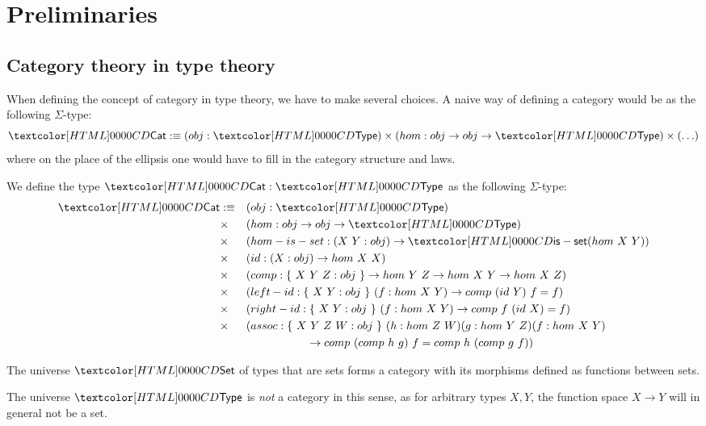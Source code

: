 \chapter{Preliminaries}

\section{Category theory in type theory}

When defining the concept of category in type theory, we have to make
several choices. A naive way of defining a category would be as the
following $\Sigma$-type:
$$
\Cat \ddefeq (obj : \Type) \times (hom : obj \to obj \to \Type) \times (\hdots)
$$
where on the place of the ellipsis one would have to fill in the
category structure and laws. 

\begin{definition}[Category]
  We define the type $\Cat : \Type$ as the following $\Sigma$-type:
  \begin{align*}
    \Cat &\ddefeq &&(obj : \Type) \\
         &\times &&(hom : obj \to obj \to \Type) \\
         &\times &&(hom-is-set : (X\ Y : obj) \to \isset (hom\ X\ Y)) \\
         &\times &&(id : (X : obj) \to hom\ X\ X) \\
         &\times &&(comp : \{\ X\ Y\ Z : obj\ \} \to hom\ Y\ Z \to hom\ X\ Y \to hom\ X\ Z) \\
         &\times &&(left-id : \{\ X\ Y : obj\ \}\ (f : hom\ X\ Y) \to comp\ (id\ Y)\ f = f) \\
         &\times &&(right-id : \{\ X\ Y : obj\ \}\ (f : hom\ X\ Y) \to comp\ f\ (id\ X) = f) \\
         &\times &&(assoc : \{\ X\ Y\ Z\ W : obj\ \}\ (h : hom\ Z\ W) (g : hom\ Y\ Z) (f : hom\ X\ Y) \\
         & &&\ \ \ \ \ \ \ \ \ \ \ \ \ \ \ \ \to comp\ (comp\ h\ g)\ f = comp\ h\ (comp\ g\ f))
  \end{align*}
\end{definition}

\begin{example}
  The universe $\Set$ of types that are sets forms a category with its
  morphisms defined as functions between sets.
\end{example}

\begin{example}
  The universe $\Type$ is \emph{not} a category in this sense, as for
  arbitrary types $X, Y$, the function space $X \to Y$ will in general
  not be a set.
\end{example}

